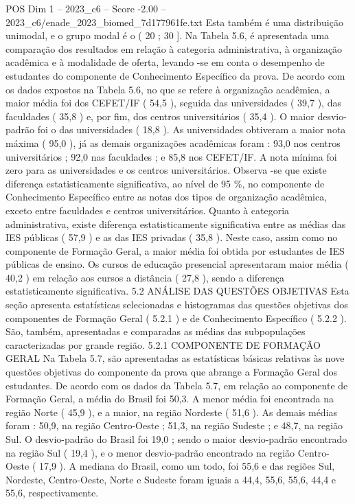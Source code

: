 \begin{textsample}{POS Dim 1 – 2023\_c6 – Score -2.00 – 2023\_c6/enade\_2023\_biomed\_7d177961fe.txt}
Esta também é uma distribuição unimodal, e o grupo modal é o ( 20 ; 30 ].
Na Tabela 5.6, é apresentada uma comparação dos resultados em relação à categoria administrativa, à organização acadêmica e à modalidade de oferta, levando -se em conta o desempenho de estudantes do componente de Conhecimento Específico da prova.
De acordo com os dados expostos na Tabela 5.6, no que se refere à organização acadêmica, a maior média foi dos CEFET/IF ( 54,5 ), seguida das universidades ( 39,7 ), das faculdades ( 35,8 ) e, por fim, dos centros universitários ( 35,4 ).
O maior desvio-padrão foi o das universidades ( 18,8 ).
As universidades obtiveram a maior nota máxima ( 95,0 ), já as demais organizações acadêmicas foram : 93,0 nos centros universitários ; 92,0 nas faculdades ; e 85,8 nos CEFET/IF.
A nota mínima foi zero para as universidades e os centros universitários.
Observa -se que existe diferença estatisticamente significativa, ao nível de 95 \%, no componente de Conhecimento Específico entre as notas dos tipos de organização acadêmica, exceto entre faculdades e centros universitários.
Quanto à categoria administrativa, existe diferença estatisticamente significativa entre as médias das IES públicas ( 57,9 ) e as das IES privadas ( 35,8 ).
Neste caso, assim como no componente de Formação Geral, a maior média foi obtida por estudantes de IES públicas de ensino.
Os cursos de educação presencial apresentaram maior média ( 40,2 ) em relação aos cursos a distância ( 27,8 ), sendo a diferença estatisticamente significativa. 5.2 ANÁLISE DAS QUESTÕES OBJETIVAS Esta seção apresenta estatísticas selecionadas e histogramas das questões objetivas dos componentes de Formação Geral ( 5.2.1 ) e de Conhecimento Específico ( 5.2.2 ).
São, também, apresentadas e comparadas as médias das subpopulações caracterizadas por grande região. 5.2.1 COMPONENTE DE FORMAÇÃO GERAL Na Tabela 5.7, são apresentadas as estatísticas básicas relativas às nove questões objetivas do componente da prova que abrange a Formação Geral dos estudantes.
De acordo com os dados da Tabela 5.7, em relação ao componente de Formação Geral, a média do Brasil foi 50,3.
A menor média foi encontrada na região Norte ( 45,9 ), e a maior, na região Nordeste ( 51,6 ).
As demais médias foram : 50,9, na região Centro-Oeste ; 51,3, na região Sudeste ; e 48,7, na região Sul.
O desvio-padrão do Brasil foi 19,0 ; sendo o maior desvio-padrão encontrado na região Sul ( 19,4 ), e o menor desvio-padrão encontrado na região Centro-Oeste ( 17,9 ).
A mediana do Brasil, como um todo, foi 55,6 e das regiões Sul, Nordeste, Centro-Oeste, Norte e Sudeste foram iguais a 44,4, 55,6, 55,6, 44,4 e 55,6, respectivamente.

\end{textsample}
